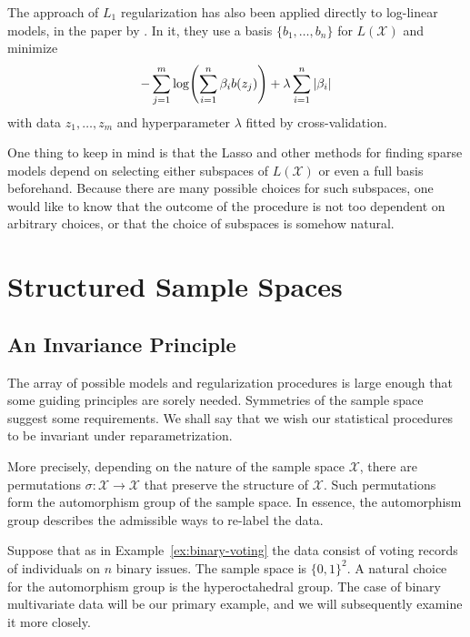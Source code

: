 \documentclass[cclicense]{hmcthesis}
\providecommand*{\xs}{\mathcal X}
\numberwithin{equation}{chapter}
\numberwithin{thmcounter}{chapter}
\begin{document}
    The approach of $L_1$ regularization has also been applied directly to
    log-linear models, in the paper by \citet{SPEC}.  In it, they use a basis
    $\{b_1, \ldots, b_n\}$ for $L(\xs)$ and minimize
    \[
        - \sum_{j=1}^m \log \pdel*{\sum_{i=1}^n \beta_i b(z_j)} + \lambda
        \sum_{i=1}^n |\beta_i| 
    \]
    with data $z_1, \ldots, z_m$ and hyperparameter $\lambda$ fitted by
    cross-validation.

    One thing to keep in mind is that the Lasso and other methods for finding
    sparse models depend on selecting either subspaces of $L(\xs)$ or even a
    full basis beforehand.  Because there are many possible choices for such
    subspaces, one would like to know that the outcome of the procedure is not
    too dependent on arbitrary choices, or that the choice of subspaces is
    somehow natural.


\chapter{Structured Sample Spaces}

\section{An Invariance Principle}
    
    The array of possible models and regularization procedures is large enough
    that some guiding principles are sorely needed.  Symmetries of the sample
    space suggest some requirements.  We shall say that we wish our statistical
    procedures to be invariant under reparametrization.  

    More precisely, depending on the nature of the sample space $\xs$, there are
    permutations $\sigma: \xs \to \xs$ that preserve the structure of $\xs$.
    Such permutations form the automorphism group of the sample space.  In
    essence, the automorphism group describes the admissible ways to re-label
    the data.

    \begin{example}
        Suppose that as in Example~\ref{ex:binary-voting} the data consist of
        voting records of individuals on $n$ binary issues.  The sample space is
        $\{0, 1\}^2$.  A natural choice for the automorphism group is the
        hyperoctahedral group.  The case of binary multivariate data will be our
        primary example, and we will subsequently examine it more closely.
    \end{example}
    
\end{document}
